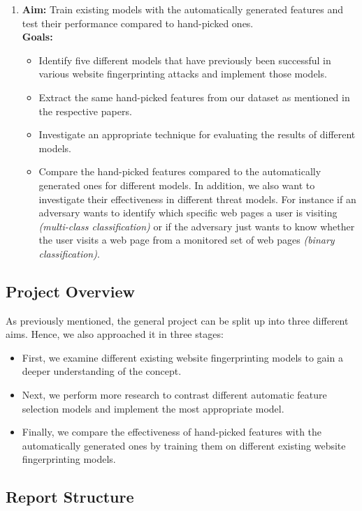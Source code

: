 \begin{enumerate}
   \item \textbf{Aim:} Train existing models with the automatically generated features and test their performance compared to hand-picked ones.\\
   \textbf{Goals:}
   \begin{itemize}
      \item Identify five different models that have previously been successful in various website fingerprinting attacks and implement those models.
      \item Extract the same hand-picked features from our dataset as mentioned in the respective papers.
      \item Investigate an appropriate technique for evaluating the results of different models.
      \item Compare the hand-picked features compared to the automatically generated ones for different models. In addition, we also want to investigate
         their effectiveness in different threat models. For instance if an adversary wants to identify which specific web pages a user is visiting \textit{(multi-class classification)} or
         if the adversary just wants to know whether the user visits a web page from a monitored set of web pages \textit{(binary classification)}.
   \end{itemize}

\end{enumerate}

\newpage

\subsection{Project Overview}
As previously mentioned, the general project can be split up into three different aims. Hence, we also approached it in three stages:

\begin{itemize}
\item First, we examine different existing website fingerprinting models to gain a deeper understanding of the concept.
\item Next, we perform more research to contrast different automatic feature selection models and implement the most appropriate model.
\item Finally, we compare the effectiveness of hand-picked features with the automatically generated ones by training them on different existing website fingerprinting models.
\end{itemize}


\subsection{Report Structure}
